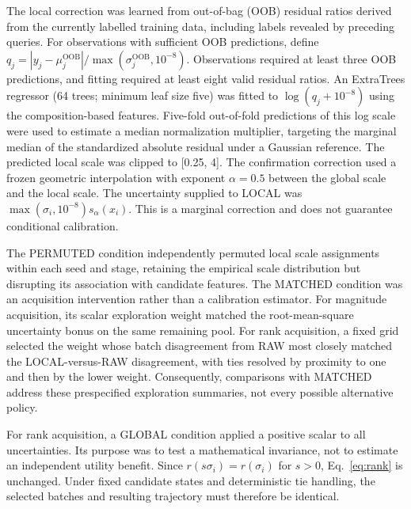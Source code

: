\documentclass[11pt]{article}
\begin{document}
The local correction was learned from out-of-bag (OOB) residual ratios derived from the currently labelled training data, including labels revealed by preceding queries. For observations with sufficient OOB predictions, define \(q_j=|y_j-\mu_j^{\mathrm{OOB}}|/\max(\sigma_j^{\mathrm{OOB}},10^{-8})\). Observations required at least three OOB predictions, and fitting required at least eight valid residual ratios. An ExtraTrees regressor (64 trees; minimum leaf size five) was fitted to \(\log(q_j+10^{-8})\) using the composition-based features. Five-fold out-of-fold predictions of this log scale were used to estimate a median normalization multiplier, targeting the marginal median of the standardized absolute residual under a Gaussian reference. The predicted local scale was clipped to [0.25, 4]. The confirmation correction used a frozen geometric interpolation with exponent \(\alpha=0.5\) between the global scale and the local scale. The uncertainty supplied to LOCAL was \(\max(\sigma_i,10^{-8})s_{\alpha}(x_i)\). This is a marginal correction and does not guarantee conditional calibration.

The PERMUTED condition independently permuted local scale assignments within each seed and stage, retaining the empirical scale distribution but disrupting its association with candidate features. The MATCHED condition was an acquisition intervention rather than a calibration estimator. For magnitude acquisition, its scalar exploration weight matched the root-mean-square uncertainty bonus on the same remaining pool. For rank acquisition, a fixed grid selected the weight whose batch disagreement from RAW most closely matched the LOCAL-versus-RAW disagreement, with ties resolved by proximity to one and then by the lower weight. Consequently, comparisons with MATCHED address these prespecified exploration summaries, not every possible alternative policy.

For rank acquisition, a GLOBAL condition applied a positive scalar to all uncertainties. Its purpose was to test a mathematical invariance, not to estimate an independent utility benefit. Since \(r(s\sigma_i)=r(\sigma_i)\) for \(s>0\), Eq.~\ref{eq:rank} is unchanged. Under fixed candidate states and deterministic tie handling, the selected batches and resulting trajectory must therefore be identical.
\end{document}
